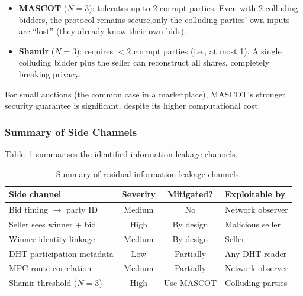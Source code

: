 \begin{itemize}[noitemsep]
  \item \textbf{MASCOT} ($N{=}3$): tolerates up to 2 corrupt parties.  Even
    with 2 colluding bidders, the protocol remains secure,only the
    colluding parties' own inputs are ``lost'' (they already know their
    own bids).
  \item \textbf{Shamir} ($N{=}3$): requires $< 2$ corrupt parties (i.e.,
    at most 1).  A single colluding bidder plus the seller can
    reconstruct all shares, completely breaking privacy.
\end{itemize}

For small auctions (the common case in a marketplace), MASCOT's stronger
security guarantee is significant, despite its higher computational cost.

\subsubsection{Summary of Side Channels}

Table~\ref{tab:side-channels} summarises the identified information leakage
channels.

\begin{table}[H]
\centering
\small
\begin{tabular}{p{3.8cm}ccp{3.5cm}}
\toprule
\textbf{Side channel} & \textbf{Severity} & \textbf{Mitigated?} & \textbf{Exploitable by} \\
\midrule
Bid timing $\rightarrow$ party ID     & Medium & No        & Network observer \\
Seller sees winner + bid               & High   & By design & Malicious seller \\
Winner identity linkage                & Medium & By design & Seller \\
DHT participation metadata             & Low    & Partially & Any DHT reader \\
MPC route correlation                  & Medium & Partially & Network observer \\
Shamir threshold ($N{=}3$)             & High   & Use MASCOT & Colluding parties \\
\bottomrule
\end{tabular}
\caption{Summary of residual information leakage channels.}
\label{tab:side-channels}
\end{table}
